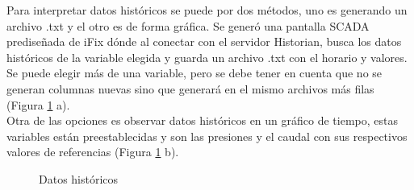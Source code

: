 Para interpretar datos históricos se puede por dos métodos, uno es generando un archivo .txt y el otro es de forma gráfica. 
Se generó una pantalla SCADA prediseñada de iFix dónde al conectar con el servidor Historian, busca los datos históricos de la variable elegida y guarda un archivo .txt con el horario y valores. Se puede elegir más de una variable, pero se debe tener en cuenta que no se generan columnas nuevas sino que generará en el mismo archivos más filas (Figura \ref{fig:grafhist} a).\\
Otra de las opciones es observar datos históricos en un gráfico de tiempo, estas variables están preestablecidas y son las presiones y el caudal con sus respectivos valores de referencias (Figura \ref{fig:grafhist} b).


\begin{figure}[htbp]
	\centering
	\caption{Datos históricos} \label{fig:grafhist}
\end{figure}





\newpage